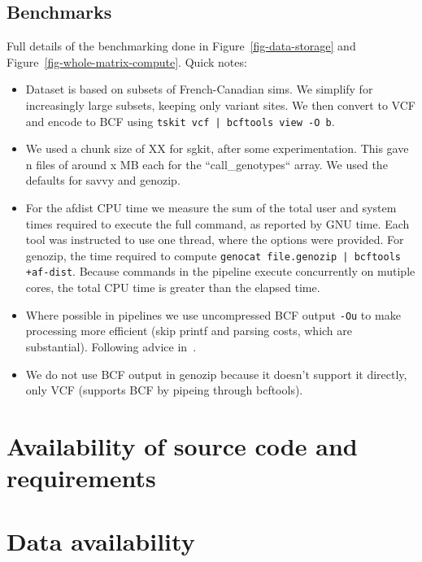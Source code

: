 \documentclass[a4paper,num-refs]{oup-contemporary}
\begin{document}

\subsection{Benchmarks}
Full details of the benchmarking done in
Figure~\ref{fig-data-storage} and
Figure~\ref{fig-whole-matrix-compute}.
Quick notes:

\begin{itemize}
\item Dataset is based on subsets of French-Canadian sims. We simplify
for increasingly large subsets, keeping only variant sites. We then
convert to VCF and encode to BCF using
\texttt{tskit vcf | bcftools view -O b}.
\item We used a chunk size of XX for sgkit, after some experimentation.
This gave n files of around x MB each for the ``call\_genotypes`` array.
We used the defaults for savvy and genozip.
\item For the afdist CPU time we measure the sum of the total user and
system times required to execute the full command, as reported by GNU
time. Each tool was instructed to use one thread, where the options
were provided. For genozip, the time required to compute
\texttt{genocat file.genozip | bcftools +af-dist}. Because commands
in the pipeline execute concurrently on mutiple cores, the total CPU time is
greater than the elapsed time.
\item Where possible in pipelines we use uncompressed BCF
 output \texttt{-Ou} to make processing more efficient (skip printf
and parsing costs, which are substantial). Following advice
in~\citep{danecek2021twelve}.
\item We do not use BCF output in genozip because it doesn't support
it directly, only VCF (supports BCF by pipeing through bcftools).
\end{itemize}

\section{Availability of source code and requirements}

\section{Data availability}
\end{document}
